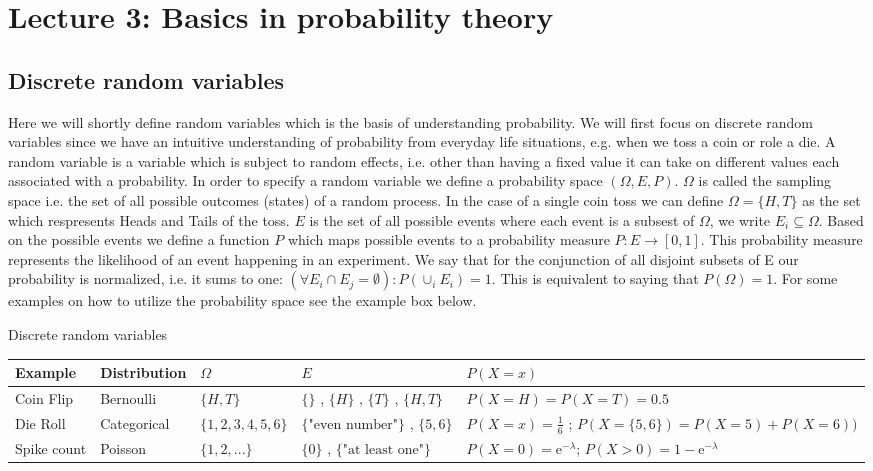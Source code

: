 \section[Basics in probability theory]{Lecture 3: Basics in probability theory}

\subsection{Discrete random variables}

Here we will shortly define random variables which is the basis of understanding probability. We will first focus on discrete random variables since we have an intuitive understanding of probability from everyday life situations, e.g. when we toss a coin or role a die. 
A random variable is a variable which is subject to random effects, i.e. other than having a fixed value it can take on different values each associated with a probability. In order to specify a random variable we define a probability space $(\Omega, E, P)$. $\Omega$ is called the sampling space i.e. the set of all possible outcomes (states) of a random process. In the case of a single coin toss we can define $\Omega = \lbrace H , T\rbrace$ as the set which respresents Heads and Tails of the toss. $E$ is the set of all possible events where each event is a subsest of $\Omega$, we write $ E_i \subseteq \Omega $. Based on the possible events we define a function $P$ which maps possible events to a probability measure $P: E \rightarrow [0,1]$. This probability measure represents the likelihood of an event happening in an experiment. We say that for the conjunction of all disjoint subsets of E our probability is normalized, i.e. it sums to one: $(\forall E_i \cap E_j = \emptyset): P(\cup_i E_i) = 1$. This is equivalent to saying that $P(\Omega) = 1$. For some examples on how to utilize the probability space see the example box below. \\

\begin{bbbox}{Discrete random variables}
	\begin{small}
	\begin{tabularx}{\textwidth}{|l|l|l|X|X|} %
	\hline
	Example & Distribution & $\Omega$ & $E$ & $P(X=x)$ \\ \hline
	Coin Flip & Bernoulli & $\lbrace H, T \rbrace$ & $\lbrace \rbrace$ , $\lbrace H \rbrace$ , $\lbrace T \rbrace$ , $\lbrace H,T \rbrace$ & $P(X = H) = P(X = T) = 0.5$ \\ \hline
	Die Roll & Categorical & $\lbrace 1,2,3,4,5,6 \rbrace $ & $\lbrace \mbox{"even number"} \rbrace$ , $\lbrace 5,6 \rbrace $ & $P(X = x) = \frac{1}{6}$ ; $P(X = \{5,6\}) = P(X = 5) + P(X = 6))$ \\ \hline
	Spike count & Poisson & $ \lbrace 1,2,... \rbrace $ & $\lbrace 0 \rbrace$ , $\lbrace \mbox{"at least one"} \rbrace $ & $P(X = 0) = \mbox{e}^{-\lambda}$; $P(X > 0) = 1-\mbox{e}^{-\lambda}$ \\ \hline
	
	\end{tabularx}
	\end{small}
\end{bbbox}

